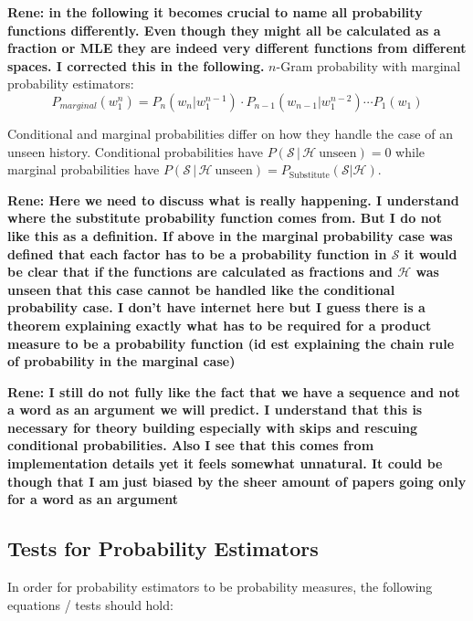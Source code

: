 \documentclass[11pt,a4paper]{article}
\newcommand{\Seq}{\mathcal{S}}
\newcommand{\Hist}{\mathcal{H}}
\newcommand{\rp}[1]{\textbf{Rene: #1}}
\begin{document}
  \rp{in the following it becomes crucial to name all probability functions
  differently. Even though they might all be calculated as a fraction or MLE
  they are indeed very different functions from different spaces. I corrected
  this in the following.}
  $n$-Gram probability with marginal probability estimators:
  \begin{equation}
    P_{marginal}(w_1^n) = P_n(w_n | w_1^{n-1}) \cdot P_{n-1}(w_{n-1} | w_1^{n-2}) \dotsm P_1(w_1)
  \end{equation}

  Conditional and marginal probabilities differ  on how they handle the case of
  an unseen history. Conditional probabilities have
  $P(\Seq \, | \, \Hist \: \mathrm{unseen}) = 0$
  while marginal probabilities have
  $P(\Seq \, | \, \Hist \: \mathrm{unseen}) = P_\mathrm{Substitute}(\Seq | \Hist)$.

  \rp{Here we need to discuss what is really happening. I understand where the
  substitute probability function comes from. But I do not like this as a
  definition. If above in the marginal probability case was defined that each
  factor has to be a probability function in $\Seq$ it would be clear that if
  the functions are calculated as fractions and $\Hist$ was unseen that this
  case cannot be handled like the conditional probability case. I don't have
  internet here but I guess there is a theorem explaining exactly what has to be
  required for a product measure to be a probability function (id est explaining
  the chain rule of probability in the marginal case)}

  \rp{I still do not fully like the fact that we have a sequence and not a word
  as an argument we will predict. I understand that this is necessary for theory
  building especially with skips and rescuing conditional probabilities. Also I
  see that this comes from implementation details yet it feels somewhat
  unnatural. It could be though that I am just biased by the sheer amount of
  papers going only for a word as an argument}

  \subsection{Tests for Probability Estimators}

  In order for probability estimators to be probability measures, the
  following equations / tests should hold:
\end{document}
